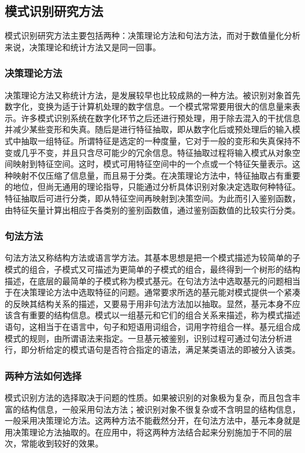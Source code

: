 \subsection{模式识别研究方法}

模式识别研究方法主要包括两种：决策理论方法和句法方法，而对于数值量化分析来说，决策理论和统计方法又是同一回事。

\subsubsection{决策理论方法}

决策理论方法又称统计方法，是发展较早也比较成熟的一种方法。被识别对象首先数字化，变换为适于计算机处理的数字信息。一个模式常常要用很大的信息量来表示。许多模式识别系统在数字化环节之后还进行预处理，用于除去混入的干扰信息并减少某些变形和失真。随后是进行特征抽取，即从数字化后或预处理后的输入模式中抽取一组特征。所谓特征是选定的一种度量，它对于一般的变形和失真保持不变或几乎不变，并且只含尽可能少的冗余信息。特征抽取过程将输入模式从对象空间映射到特征空间。这时，模式可用特征空间中的一个点或一个特征矢量表示。这种映射不仅压缩了信息量，而且易于分类。在决策理论方法中，特征抽取占有重要的地位，但尚无通用的理论指导，只能通过分析具体识别对象决定选取何种特征。特征抽取后可进行分类，即从特征空间再映射到决策空间。为此而引入鉴别函数，由特征矢量计算出相应于各类别的鉴别函数值，通过鉴别函数值的比较实行分类。

\subsubsection{句法方法}

句法方法又称结构方法或语言学方法。其基本思想是把一个模式描述为较简单的子模式的组合，子模式又可描述为更简单的子模式的组合，最终得到一个树形的结构描述，在底层的最简单的子模式称为模式基元。在句法方法中选取基元的问题相当于在决策理论方法中选取特征的问题。通常要求所选的基元能对模式提供一个紧凑的反映其结构关系的描述，又要易于用非句法方法加以抽取。显然，基元本身不应该含有重要的结构信息。模式以一组基元和它们的组合关系来描述，称为模式描述语句，这相当于在语言中，句子和短语用词组合，词用字符组合一样。基元组合成模式的规则，由所谓语法来指定。一旦基元被鉴别，识别过程可通过句法分析进行，即分析给定的模式语句是否符合指定的语法，满足某类语法的即被分入该类。

\subsubsection{两种方法如何选择}

模式识别方法的选择取决于问题的性质。如果被识别的对象极为复杂，而且包含丰富的结构信息，一般采用句法方法；被识别对象不很复杂或不含明显的结构信息，一般采用决策理论方法。这两种方法不能截然分开，在句法方法中，基元本身就是用决策理论方法抽取的。在应用中，将这两种方法结合起来分别施加于不同的层次，常能收到较好的效果。


